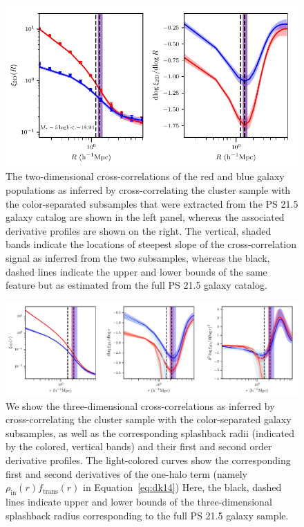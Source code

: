 \documentclass[iop, apjl, twocolappendix, numberedappendix]{emulateapj}
\begin{document}
\begin{figure}
    \includegraphics[scale=0.65]{color_separated_2D_with_spline_no_mc.pdf}
\caption{The two-dimensional cross-correlations
of the red and blue galaxy populations as inferred by
cross-correlating the cluster sample with the color-separated
subsamples that were extracted from the PS 21.5 galaxy catalog are
shown in the left panel, whereas the associated derivative profiles
are shown on the right. The vertical, shaded bands indicate the
locations of steepest slope of the cross-correlation signal as
inferred from the two subsamples, whereas the black, dashed lines
indicate the upper and lower bounds of the same feature but as
estimated from the full PS 21.5 galaxy catalog. }
   \label{fig:color_curve_2D} 
\end{figure}
\begin{figure}
    \includegraphics[scale=0.76]{color_separated_3D_with_spline_no_mc.pdf}
\caption{We show the three-dimensional cross-correlations as
inferred by cross-correlating the cluster sample with the
color-separated galaxy subsamples, as well as the corresponding
splashback radii (indicated by the colored, vertical bands) and
their first and second order derivative profiles. The light-colored 
curves show the corresponding first and second derivatives of the one-halo
term (namely $\rho_{\mathrm{in}}(r)f_{\mathrm{trans}}(r)$ in Equation~\ref{eq:dk14})
Here, the black, dashed lines indicate upper and lower bounds of the 
three-dimensional splashback radius corresponding to the full PS 21.5 galaxy sample.}
   \label{fig:color_curve_3D} 
\end{figure}
\end{document}
